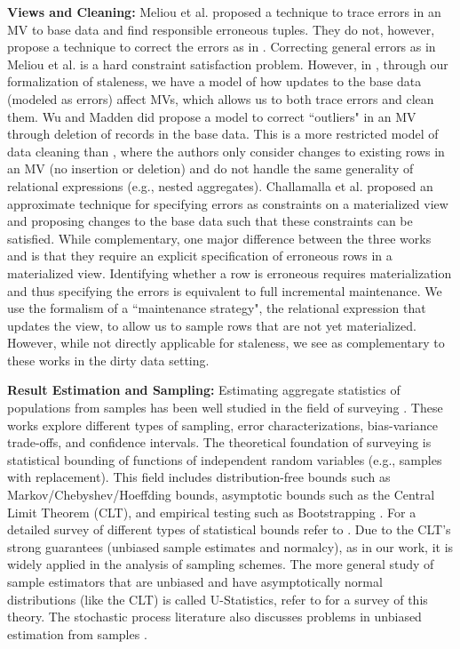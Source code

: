 {\noindent \bf Views and Cleaning:} Meliou et al. \cite{DBLP:conf/sigmod/MeliouGNS11} proposed a technique to trace errors in an MV to base data and find responsible erroneous tuples. 
They do not, however, propose a technique to correct the errors as in \svc.
Correcting general errors as in Meliou et al. is a hard constraint satisfaction problem.
However, in \svc, through our formalization of staleness, we have a model of how updates to the base data (modeled as errors) affect MVs, which allows us to both trace errors and clean them.
Wu and Madden \cite{DBLP:journals/pvldb/0002M13} did propose a model to correct ``outliers" in an MV through deletion of records in the base data.
This is a more restricted model of data cleaning than \svc, where the authors only consider changes to existing rows in an MV (no insertion or deletion) and do not handle the same generality of relational expressions (e.g., nested aggregates).
Challamalla et al. \cite{DBLP:conf/sigmod/ChalamallaIOP14} proposed an approximate technique for specifying errors as constraints on a materialized view and proposing changes to the base data such that these constraints can be satisfied.
While complementary, one major difference between the three works \cite{DBLP:conf/sigmod/MeliouGNS11, DBLP:journals/pvldb/0002M13, DBLP:conf/sigmod/ChalamallaIOP14} and \svc is that they require an explicit specification of erroneous rows in a materialized view.
Identifying whether a row is erroneous requires materialization and thus specifying the errors is equivalent to full incremental maintenance. 
We use the formalism of a ``maintenance strategy", the relational expression that updates the view, to allow us to sample rows that are not yet materialized.
However, while not directly applicable for staleness, we see \svc as complementary to these works in the dirty data setting. 


\vspace{.5em}

{\noindent \bf Result Estimation and Sampling:}
Estimating aggregate statistics of populations from samples has been well studied in the field of surveying \cite{weisberg2009total,valliant2000finite, hansen1987some, barnett1991sample, sarndal2003model, kalton1983introduction}.
These works explore different types of sampling, error characterizations, bias-variance trade-offs, and confidence intervals.
The theoretical foundation of surveying is statistical bounding of functions of independent random variables (e.g., samples with replacement).
This field includes distribution-free bounds such as Markov/Chebyshev/Hoeffding bounds, asymptotic bounds such as the Central Limit Theorem (CLT), and empirical testing such as Bootstrapping \cite{hinkley1988bootstrap}.
For a detailed survey of different types of statistical bounds refer to \cite{hahn2011statistical}.
Due to the CLT's strong guarantees (unbiased sample estimates and normalcy), as in our work, it is widely applied in the analysis of sampling schemes.
The more general study of sample estimators that are unbiased and have asymptotically normal distributions (like the CLT) is called U-Statistics, refer to \cite{lee1990u} for a survey of this theory.
The stochastic process literature also discusses problems in unbiased estimation from samples \cite{jacod1987limit}.

